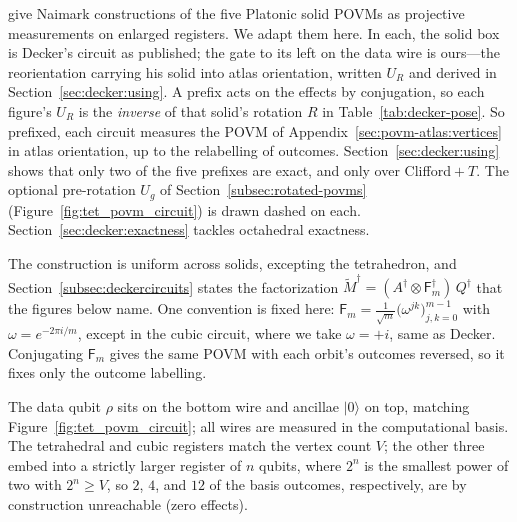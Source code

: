 \documentclass[11pt, oneside, openany]{scrbook}
\newcommand{\ket}[1]{|#1\rangle}
\begin{document}
\textcite{decker2004quantumcircuitssinglequbit} give Naimark constructions of the five Platonic solid POVMs as projective measurements on enlarged registers. We adapt them here. In each, the solid box is Decker's circuit as published; the gate to its left on the data wire is ours---the reorientation carrying his solid into atlas orientation, written $U_R$ and derived in Section~\ref{sec:decker:using}. A prefix acts on the effects by conjugation, so each figure's $U_R$ is the \textit{inverse} of that solid's rotation $R$ in Table~\ref{tab:decker-pose}. So prefixed, each circuit measures the POVM of Appendix~\ref{sec:povm-atlas:vertices} in atlas orientation, up to the relabelling of outcomes. Section~\ref{sec:decker:using} shows that only two of the five prefixes are exact, and only over Clifford${}+T$. The optional pre-rotation $U_g$ of Section~\ref{subsec:rotated-povms} (Figure~\ref{fig:tet_povm_circuit}) is drawn dashed on each. Section~\ref{sec:decker:exactness} tackles octahedral exactness.

The construction is uniform across solids, excepting the tetrahedron, and Section~\ref{subsec:deckercircuits} states the factorization $\tilde{M}^\dagger = (A^\dagger \otimes \mathsf{F}_m^\dagger)\,Q^\dagger$ that the figures below name. One convention is fixed here: $\mathsf{F}_m = \tfrac{1}{\sqrt{m}}\bigl(\omega^{jk}\bigr)_{j,k=0}^{m-1}$ with $\omega = e^{-2\pi i/m}$, except in the cubic circuit, where we take $\omega = +i$, same as Decker. Conjugating $\mathsf{F}_m$ gives the same POVM with each orbit's outcomes reversed, so it fixes only the outcome labelling.

The data qubit $\rho$ sits on the bottom wire and ancillae $\ket{0}$ on top, matching Figure~\ref{fig:tet_povm_circuit}; all wires are measured in the computational basis. The tetrahedral and cubic registers match the vertex count $V$; the other three embed into a strictly larger register of $n$ qubits, where $2^n$ is the smallest power of two with $2^n \geq V$, so $2$, $4$, and $12$ of the basis outcomes, respectively, are by construction unreachable (zero effects).
\end{document}

